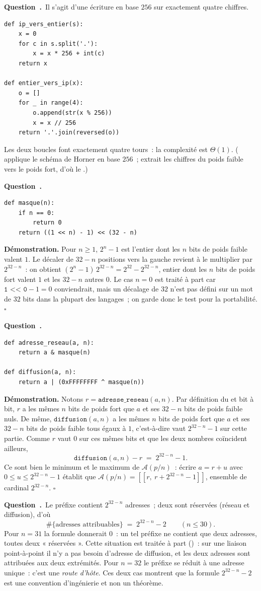 \documentclass[11pt,a4paper]{article}
\renewcommand{\Q}{\medskip\par\stepcounter{qcnt}\noindent\textbf{\color{cnc}Question~\theqcnt.}~}
\begin{document}
\Q Il s'agit d'une écriture en base $256$ sur exactement quatre chiffres.
\begin{lstlisting}
def ip_vers_entier(s):
    x = 0
    for c in s.split('.'):
        x = x * 256 + int(c)
    return x

def entier_vers_ip(x):
    o = []
    for _ in range(4):
        o.append(str(x % 256))
        x = x // 256
    return '.'.join(reversed(o))
\end{lstlisting}
Les deux boucles font exactement quatre tours~: la complexité est $\Theta(1)$.
( applique le schéma de Horner en base $256$~;
 extrait les chiffres du poids faible vers le poids fort, d'où le
.)

\Q
\begin{lstlisting}
def masque(n):
    if n == 0:
        return 0
    return ((1 << n) - 1) << (32 - n)
\end{lstlisting}
\textbf{Démonstration.} Pour $n\ge 1$, $2^{n}-1$ est l'entier dont les $n$ bits de poids
faible valent $1$. Le décaler de $32-n$ positions vers la gauche revient à le multiplier par
$2^{32-n}$~: on obtient $(2^{n}-1)\,2^{32-n}=2^{32}-2^{32-n}$, entier dont les $n$ bits de
poids fort valent $1$ et les $32-n$ autres $0$. Le cas $n=0$ est traité à part car
$\texttt{1 << 0} - 1 = 0$ conviendrait, mais un décalage de $32$ n'est pas défini sur un mot
de $32$ bits dans la plupart des langages~; on garde donc le test pour la portabilité.
\hfill$\square$

\Q
\begin{lstlisting}
def adresse_reseau(a, n):
    return a & masque(n)

def diffusion(a, n):
    return a | (0xFFFFFFFF ^ masque(n))
\end{lstlisting}
\textbf{Démonstration.} Notons $r=\texttt{adresse\_reseau}(a,n)$. Par définition du et bit à
bit, $r$ a les mêmes $n$ bits de poids fort que $a$ et ses $32-n$ bits de poids faible nuls.
De même, $\texttt{diffusion}(a,n)$ a les mêmes $n$ bits de poids fort que $a$ et ses $32-n$
bits de poids faible tous égaux à $1$, c'est-à-dire vaut $2^{32-n}-1$ sur cette partie. Comme
$r$ vaut $0$ sur ces mêmes bits et que les deux nombres coïncident ailleurs,
\[ \texttt{diffusion}(a,n)-r \;=\; 2^{32-n}-1 . \]
Ce sont bien le minimum et le maximum de $\mathcal{A}(p/n)$~: écrire $a=r+u$ avec
$0\le u\le 2^{32-n}-1$ établit que $\mathcal{A}(p/n)=[\![r,\ r+2^{32-n}-1]\!]$, ensemble de
cardinal $2^{32-n}$. \hfill$\square$

\Q Le préfixe contient $2^{32-n}$ adresses~; deux sont réservées (réseau et diffusion), d'où
\[ \#\{\text{adresses attribuables}\} \;=\; 2^{32-n}-2 \qquad (n\le 30). \]
Pour $n=31$ la formule donnerait $0$~: un tel préfixe ne contient que deux adresses, toutes
deux « réservées ». Cette situation est traitée à part ()~: sur une liaison
point-à-point il n'y a pas besoin d'adresse de diffusion, et les deux adresses sont
attribuées aux deux extrémités. Pour $n=32$ le préfixe se réduit à une adresse unique~: c'est
une \emph{route d'hôte}. Ces deux cas montrent que la formule $2^{32-n}-2$ est une convention
d'ingénierie et non un théorème.
\end{document}
